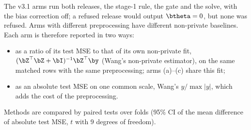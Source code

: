 The v3.1 arms run both releases, the stage-1 rule, the gate and the solve, with the bias correction off; a refused release would output $\btheta = 0$, but none was refused. Arms with different preprocessing have different non-private baselines. Each arm is therefore reported in two ways:
\begin{itemize}[noitemsep]
  \item as a ratio of its test MSE to that of its own non-private fit, $(\bZ^\top\bZ + \bI)^{-1}\bZ^\top\by$ (Wang's non-private estimator), on the same matched rows with the same preprocessing; arms (a)--(c) share this fit;
  \item as an absolute test MSE on one common scale, Wang's $y/\max|y|$, which adds the cost of the preprocessing.
\end{itemize}
Methods are compared by paired tests over folds (95\% CI of the mean difference of absolute test MSE, $t$ with 9 degrees of freedom).

